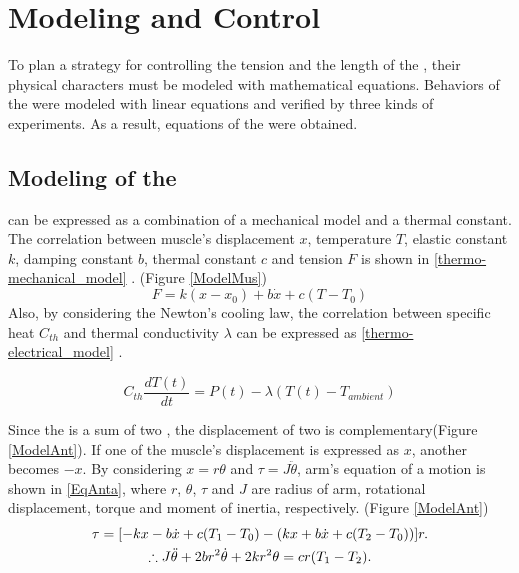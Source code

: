 \section{Modeling and Control}\label{section_modelcontrol}

To plan a strategy for controlling the tension and the length of the \scpsnospace, their physical characters must be modeled with mathematical equations. Behaviors of the \scps were modeled with linear equations and verified by three kinds of experiments. As a result, equations of the \anta were obtained.

\subsection{Modeling of the \ANTA}\label{section_thermo_model}
\scp can be expressed as a combination of a mechanical model and a thermal constant. The correlation between muscle's displacement $x$, temperature $T$, elastic constant $k$, damping constant $b$, thermal constant $c$ and tension $F$ is shown in \eqref{thermo-mechanical_model} \cite{yip}.
(Figure \ref{ModelMus})
\begin{equation} \label{thermo-mechanical_model}
F=k(x-x_0) + b\dot{x}+c(T-T_0)
\end{equation}
Also, by considering the Newton's cooling law, the correlation between specific heat $C_{th}$ and thermal conductivity $\lambda$ can be expressed as \eqref{thermo-electrical_model} \cite{yip}.

\begin{equation} \label{thermo-electrical_model}
C_{th}\frac{dT(t)}{dt} = P(t) - \lambda(T(t)-T_{ambient})
\end{equation}

Since the \anta is a sum of two \scpsnospace, the displacement of two \scps is complementary(Figure \ref{ModelAnt}). If one of the muscle's displacement is expressed as $x$, another becomes $-x$. By considering $x=r\theta$ and $\tau=J\ddot{\theta}$, arm's equation of a motion is shown in \eqref{EqAnta}, where $r$, $\theta$, $\tau$ and $J$ are radius of arm, rotational displacement, torque and moment of inertia, respectively.
(Figure \ref{ModelAnt})
\begin{gather}
\tau = [-kx-b\dot{x}+c(T_1-T_0) - (kx+b\dot{x}+c(T_2-T_0))]r. \notag \\
\therefore J\ddot{\theta}+2br^2\dot{\theta}+2kr^2\theta = cr(T_1-T_2). \label{EqAnta}
\end{gather}

